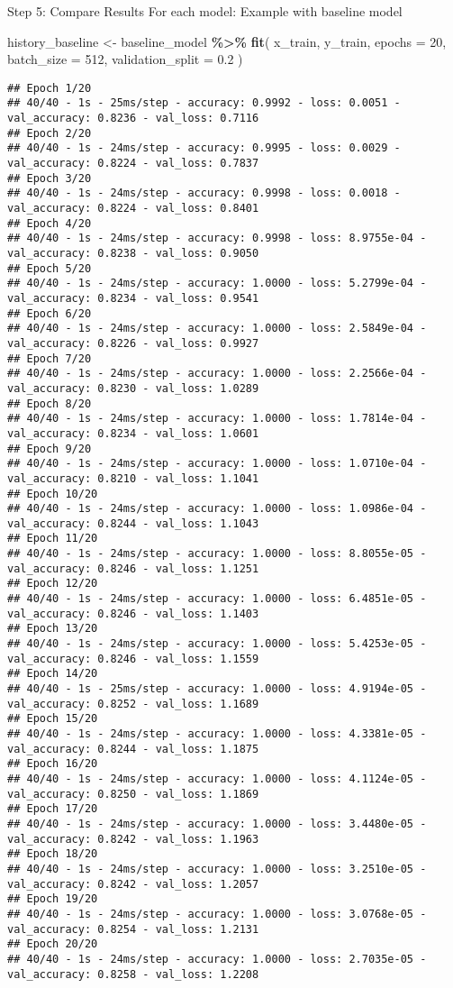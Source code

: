 \documentclass[
]{article}
\newenvironment{Shaded}{\begin{snugshade}}{\end{snugshade}}
\newcommand{\AttributeTok}[1]{\textcolor[rgb]{0.13,0.29,0.53}{#1}}
\newcommand{\DecValTok}[1]{\textcolor[rgb]{0.00,0.00,0.81}{#1}}
\newcommand{\FloatTok}[1]{\textcolor[rgb]{0.00,0.00,0.81}{#1}}
\newcommand{\FunctionTok}[1]{\textcolor[rgb]{0.13,0.29,0.53}{\textbf{#1}}}
\newcommand{\NormalTok}[1]{#1}
\newcommand{\OtherTok}[1]{\textcolor[rgb]{0.56,0.35,0.01}{#1}}
\newcommand{\SpecialCharTok}[1]{\textcolor[rgb]{0.81,0.36,0.00}{\textbf{#1}}}
\begin{document}
Step 5: Compare Results For each model: Example with baseline model

\begin{Shaded}
\begin{Highlighting}[]
\NormalTok{history\_baseline }\OtherTok{\textless{}{-}}\NormalTok{ baseline\_model }\SpecialCharTok{\%\textgreater{}\%} \FunctionTok{fit}\NormalTok{(}
\NormalTok{  x\_train, y\_train,}
  \AttributeTok{epochs =} \DecValTok{20}\NormalTok{,}
  \AttributeTok{batch\_size =} \DecValTok{512}\NormalTok{,}
  \AttributeTok{validation\_split =} \FloatTok{0.2}
\NormalTok{)}
\end{Highlighting}
\end{Shaded}

\begin{verbatim}
## Epoch 1/20
## 40/40 - 1s - 25ms/step - accuracy: 0.9992 - loss: 0.0051 - val_accuracy: 0.8236 - val_loss: 0.7116
## Epoch 2/20
## 40/40 - 1s - 24ms/step - accuracy: 0.9995 - loss: 0.0029 - val_accuracy: 0.8224 - val_loss: 0.7837
## Epoch 3/20
## 40/40 - 1s - 24ms/step - accuracy: 0.9998 - loss: 0.0018 - val_accuracy: 0.8224 - val_loss: 0.8401
## Epoch 4/20
## 40/40 - 1s - 24ms/step - accuracy: 0.9998 - loss: 8.9755e-04 - val_accuracy: 0.8238 - val_loss: 0.9050
## Epoch 5/20
## 40/40 - 1s - 24ms/step - accuracy: 1.0000 - loss: 5.2799e-04 - val_accuracy: 0.8234 - val_loss: 0.9541
## Epoch 6/20
## 40/40 - 1s - 24ms/step - accuracy: 1.0000 - loss: 2.5849e-04 - val_accuracy: 0.8226 - val_loss: 0.9927
## Epoch 7/20
## 40/40 - 1s - 24ms/step - accuracy: 1.0000 - loss: 2.2566e-04 - val_accuracy: 0.8230 - val_loss: 1.0289
## Epoch 8/20
## 40/40 - 1s - 24ms/step - accuracy: 1.0000 - loss: 1.7814e-04 - val_accuracy: 0.8234 - val_loss: 1.0601
## Epoch 9/20
## 40/40 - 1s - 24ms/step - accuracy: 1.0000 - loss: 1.0710e-04 - val_accuracy: 0.8210 - val_loss: 1.1041
## Epoch 10/20
## 40/40 - 1s - 24ms/step - accuracy: 1.0000 - loss: 1.0986e-04 - val_accuracy: 0.8244 - val_loss: 1.1043
## Epoch 11/20
## 40/40 - 1s - 24ms/step - accuracy: 1.0000 - loss: 8.8055e-05 - val_accuracy: 0.8246 - val_loss: 1.1251
## Epoch 12/20
## 40/40 - 1s - 24ms/step - accuracy: 1.0000 - loss: 6.4851e-05 - val_accuracy: 0.8246 - val_loss: 1.1403
## Epoch 13/20
## 40/40 - 1s - 24ms/step - accuracy: 1.0000 - loss: 5.4253e-05 - val_accuracy: 0.8246 - val_loss: 1.1559
## Epoch 14/20
## 40/40 - 1s - 25ms/step - accuracy: 1.0000 - loss: 4.9194e-05 - val_accuracy: 0.8252 - val_loss: 1.1689
## Epoch 15/20
## 40/40 - 1s - 24ms/step - accuracy: 1.0000 - loss: 4.3381e-05 - val_accuracy: 0.8244 - val_loss: 1.1875
## Epoch 16/20
## 40/40 - 1s - 24ms/step - accuracy: 1.0000 - loss: 4.1124e-05 - val_accuracy: 0.8250 - val_loss: 1.1869
## Epoch 17/20
## 40/40 - 1s - 24ms/step - accuracy: 1.0000 - loss: 3.4480e-05 - val_accuracy: 0.8242 - val_loss: 1.1963
## Epoch 18/20
## 40/40 - 1s - 24ms/step - accuracy: 1.0000 - loss: 3.2510e-05 - val_accuracy: 0.8242 - val_loss: 1.2057
## Epoch 19/20
## 40/40 - 1s - 24ms/step - accuracy: 1.0000 - loss: 3.0768e-05 - val_accuracy: 0.8254 - val_loss: 1.2131
## Epoch 20/20
## 40/40 - 1s - 24ms/step - accuracy: 1.0000 - loss: 2.7035e-05 - val_accuracy: 0.8258 - val_loss: 1.2208
\end{verbatim}
\end{document}
